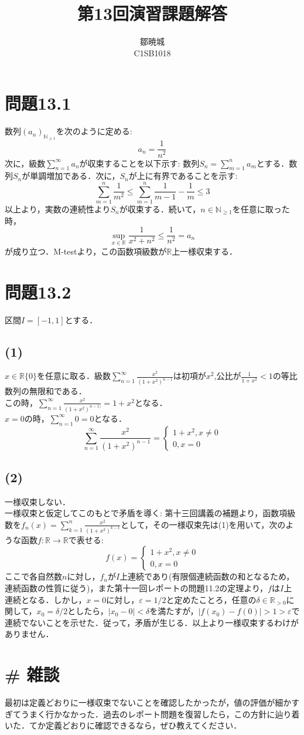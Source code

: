 \documentclass{jreport}
\newcommand{\R}{\mathbb{R}}
\newcommand{\Rp}{\mathbb{R}_{>0}}
\newcommand{\N}{\mathbb{N}}
\begin{document}
\title{第13回演習課題解答}
\author{鄒暁城\\ C1SB1018}
\maketitle
\newpage
\tableofcontents
\newpage
\setcounter{chapter}{13}
\section{問題13.1}
数列$(a_n)_{\N_{\ge 1}}$を次のように定める:
$$
a_n = \frac{1}{n^2}
$$
次に，級数$\sum\limits_{n=1}^{\infty} a_n$が収束することを以下示す:
数列$S_n = \sum\limits_{m=1}^{n} a_m$とする．数列$S_n$が単調増加である．次に，$S_n$が上に有界であることを示す:
$$
\sum_{m=1}^n  \frac{1}{m^2} \le \sum_{m=1}^n \frac{1}{m-1}- \frac{1}{m} \le 3 
$$
以上より，実数の連続性より$S_n$が収束する．続いて，$n \in \N_{\ge 1}$を任意に取った時，
$$
\sup_{x \in \R}  \frac{1}{x^2+n^2} \le \frac{1}{n^2} = a_n
$$
が成り立つ．M-testより，この函数項級数が$\R$上一様収束する．
\section{問題13.2}
区間$I=[-1,1]$とする．
\subsection{(1)}
$x\in \R\{0\}$を任意に取る．級数$\sum\limits_{n=1}^{\infty} \frac{x^2}{(1+x^2)^{n-1}}$は初項が$x^2$,公比が$\frac{1}{1+x^2}<1$の等比数列の無限和である．\\
この時，$\sum\limits_{n=1}^{\infty} \frac{x^2}{(1+x^2)^{n-1)}}=1+x^2$となる．\\
$x =0$の時，$\sum\limits_{n=1}^{\infty} 0 =0$となる．
$$
\sum_{n=1}^{\infty} \frac{x^2}{(1+x^2)^{n-1}} = \begin{cases}
1+ x^2, x\neq 0 \\
0,x=0
\end{cases}
$$
\subsection{(2)}
一様収束しない．\\
一様収束と仮定してこのもとで矛盾を導く:
第十三回講義の補題より，函数項級数を$f_n(x) =\sum\limits_{k=1}^{n} \frac{x^2}{(1+x^2)^{k-1}}$として，その一様収束先は(1)を用いて，次のような函数$f: \R \to \R$で表せる:
$$
f(x)  = \begin{cases}
1+ x^2, x\neq 0 \\
0,x=0
\end{cases}
$$
ここで各自然数$n$に対し，$f_n$が$I$上連続であり(有限個連続函数の和となるため，連続函数の性質に従う)，また第十一回レポートの問題11.2の定理より，$f$は$I$上連続となる．しかし，$x=0$に対し，$\varepsilon =1/2$と定めたことろ，任意の$\delta \in \Rp$に関して，$x_0=\delta/2$としたら，$|x_0 -0|<\delta$を満たすが，$|f(x_0)-f(0)|>1>\varepsilon$で連続でないことを示せた．従って，矛盾が生じる．以上より一様収束するわけがありません．
\newpage
\section{\# 雑談}
最初は定義どおりに一様収束でないことを確認したかったが，値の評価が細かすぎてうまく行かなかった．過去のレポート問題を復習したら，この方針に辿り着いた．てか定義どおりに確認できるなら，ぜひ教えてください．
\end{document}
